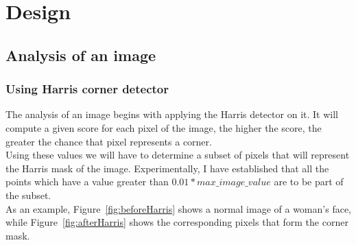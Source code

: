 \chapter{Design}

\section{Analysis of an image}

\subsection{Using Harris corner detector}
The analysis of an image begins with applying the Harris detector on it. It will compute a given score for each pixel of the image, the higher the score, the greater the chance that pixel represents a corner.\\
Using these values we will have to determine a subset of pixels that will represent the Harris mask of the image. Experimentally, I have established that all the points which have a value greater than $0.01 * max\_image\_value$ are to be part of the subset.\\
As an example, Figure~\ref{fig:beforeHarris} shows a normal image of a woman's face, while Figure~\ref{fig:afterHarris} shows the corresponding pixels that form the corner mask. \\

